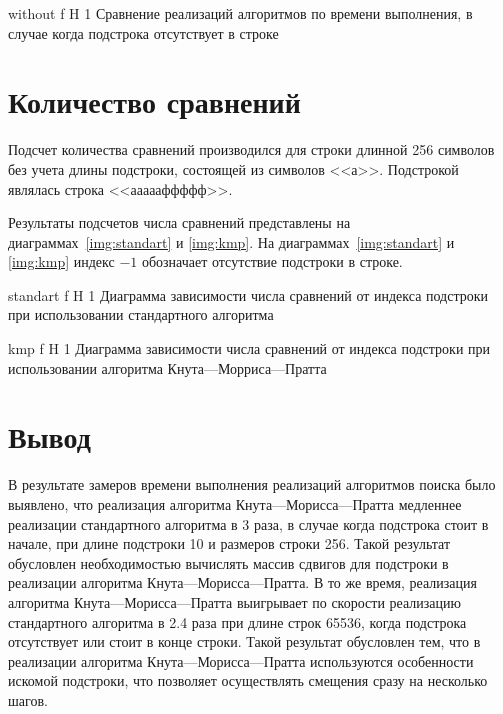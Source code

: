 {without} %
{f} %
{H} %
{1\textwidth} %
{Сравнение реализаций алгоритмов по времени выполнения, в случае когда подстрока отсутствует в строке} %

\clearpage


\section{Количество сравнений}

Подсчет количества сравнений производился для строки длинной 256 символов без учета длины подстроки, состоящей из символов <<а>>.
Подстрокой являлась строка <<аааааффффф>>. 

Результаты подсчетов числа сравнений представлены на диаграммах~\ref{img:standart} и \ref{img:kmp}.
На диаграммах~\ref{img:standart} и \ref{img:kmp} индекс $-1$ обозначает отсутствие подстроки в строке. 

{standart} %
{f} %
{H} %
{1\textwidth} %
{Диаграмма зависимости числа сравнений от индекса подстроки при использовании стандартного алгоритма} %


{kmp} %
{f} %
{H} %
{1\textwidth} %
{Диаграмма зависимости числа сравнений от индекса подстроки при использовании алгоритма Кнута---Морриса---Пратта} %

\clearpage

\section*{Вывод}

В результате замеров времени выполнения реализаций алгоритмов поиска было выявлено, что реализация алгоритма Кнута---Морисса---Пратта медленнее реализации стандартного алгоритма в 3 раза, в случае когда подстрока стоит в начале, при длине подстроки 10 и размеров строки 256. 
Такой результат обусловлен необходимостью вычислять массив сдвигов для подстроки в реализации алгоритма Кнута---Морисса---Пратта.
В то же время, реализация алгоритма Кнута---Морисса---Пратта выигрывает по скорости реализацию стандартного алгоритма в 2.4 раза при длине строк 65536, когда подстрока отсутствует или стоит в конце строки. 
Такой результат обусловлен тем, что в реализации алгоритма Кнута---Морисса---Пратта используются особенности искомой подстроки, что позволяет осуществлять смещения сразу на несколько шагов.

